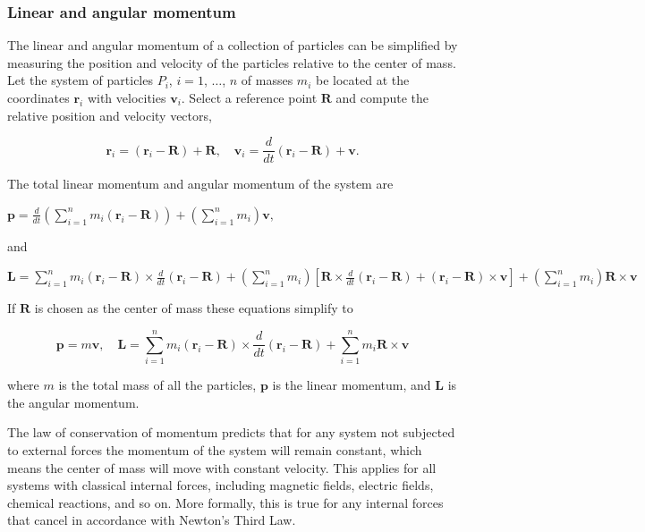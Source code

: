 \subsubsection{Linear and angular momentum}
\label{sss:line-9ff6}


The linear and angular momentum of a collection of particles can be simplified by measuring the position and velocity of the particles relative to the center of mass. Let the system of particles $P_i$, $i=1$, $\dots$, $n$ of masses $m_i$ be located at the coordinates $\mathbf{r} _i$ with velocities $\mathbf{v} _i$. Select a reference point $\mathbf{R}$ and compute the relative position and velocity vectors,


\[
\mathbf{r} _i = (\mathbf{r} _i - \mathbf{R}) + \mathbf{R}, \quad \mathbf{v} _i = \frac{d}{dt}(\mathbf{r} _i - \mathbf{R}) + \mathbf{v}.
\]


The total linear momentum and angular momentum of the system are


$\mathbf{p} = \frac{d}{dt}\left(\sum _{i=1}^n m_i (\mathbf{r} _i - \mathbf{R})\right) + \left(\sum _{i=1}^n m_i\right) \mathbf{v},$


and


$\mathbf{L} = \sum _{i=1}^n m_i (\mathbf{r} _i - \mathbf{R}) \times \frac{d}{dt}(\mathbf{r} _i - \mathbf{R}) + \left(\sum _{i=1}^n m_i \right) \left[\mathbf{R} \times \frac{d}{dt}(\mathbf{r} _i - \mathbf{R}) + (\mathbf{r} _i - \mathbf{R}) \times \mathbf{v} \right] + \left(\sum _{i=1}^n m_i \right)\mathbf{R} \times \mathbf{v}$


If $\mathbf{R}$ is chosen as the center of mass these equations simplify to


\[
\mathbf{p} = m\mathbf{v},\quad \mathbf{L} = \sum _{i=1}^n m_i (\mathbf{r} _i - \mathbf{R}) \times \frac{d}{dt}(\mathbf{r} _i - \mathbf{R}) + \sum _{i=1}^n m_i \mathbf{R} \times \mathbf{v}
\]

where $m$ is the total mass of all the particles, $\mathbf{p}$ is the linear momentum, and $\mathbf{L}$ is the angular momentum.


The law of conservation of momentum predicts that for any system not subjected to external forces the momentum of the system will remain constant, which means the center of mass will move with constant velocity. This applies for all systems with classical internal forces, including magnetic fields, electric fields, chemical reactions, and so on. More formally, this is true for any internal forces that cancel in accordance with Newton's Third Law.


